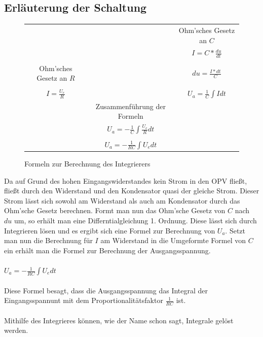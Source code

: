 \subsection{Erl\"auterung der Schaltung}
\begin{figure}[H]
  \centering
  \begin{tabular}{ccc}
    & & Ohm'sches Gesetz an $C$ \\
    & & $I=C*\frac{du}{dt}$ \\ \\
    Ohm'sches Gesetz an $R$& & $du = \frac{I*dt}{C}$ \\ \\
    $I=\frac{U_e}{R}$ & & $U_a=\frac{1}{C}\int I dt$ \\
    & Zusammenf\"uhrung der Formeln & \\
    & $U_a = -\frac{1}{C} \int \frac{U_e}{R} dt$ & \\ \\
    & $U_a = -\frac{1}{RC} \int U_e dt$ & \\
  \end{tabular}
  \caption{Formeln zur Berechnung des Integrierers}
\end{figure}
\noindent
Da auf Grund des hohen Eingangswiderstandes kein Strom in den OPV flie\ss{}t, flie\ss{}t durch den Widerstand und den Kondensator quasi der gleiche Strom. Dieser Strom l\"asst sich sowohl am Widerstand als auch am Kondensator durch das Ohm'sche Gesetz berechnen. Formt man nun das Ohm'sche Gesetz von $C$ nach $du$ um, so erh\"alt man eine Differntialgleichung 1. Ordnung. Diese l\"asst sich durch Integrieren l\"osen und es ergibt sich eine Formel zur Berechnung von $U_a$. Setzt man nun die Berechnung f\"ur $I$ am Widerstand in die Umgeformte Formel von $C$ ein erh\"alt man die Formel zur Berechnung der Ausgangsspannung. \\ \\
$U_a = -\frac{1}{RC} \int U_e dt$ \\  \\
Diese Formel besagt, dass die Ausgangsspannung das Integral der Eingangsspannunt mit dem Proportionalit\"atsfaktor $\frac{1}{RC}$ ist. \\ \\
Mithilfe des Integrieres k\"onnen, wie der Name schon sagt, Integrale gel\"ost werden.

\newpage
